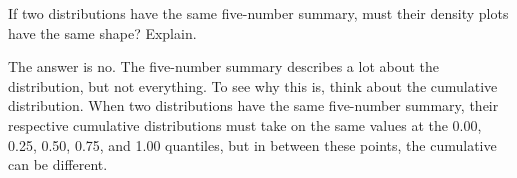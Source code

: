
If two distributions have the same five-number summary, must their
density plots have the same shape?  Explain.\TextEntry

\begin{AnswerText}
The answer is no.  The five-number summary describes a lot about
the distribution, but not everything.  To see why this is, think about
the cumulative distribution.  When two distributions have the same
five-number summary, their respective cumulative distributions must
take on the same values at the 0.00, 0.25, 0.50, 0.75, and 1.00
quantiles, but in between these points, the cumulative can be different.
\end{AnswerText}